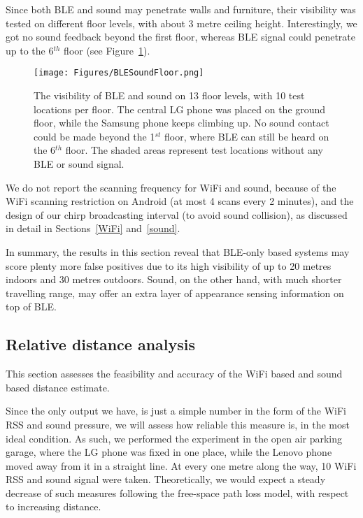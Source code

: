 \documentclass[graybox]{svmult}
\begin{document}
Since both BLE and sound may penetrate walls and furniture, their visibility was tested on different floor levels, with about 3 metre ceiling height. Interestingly, we got no sound feedback beyond the first floor, whereas BLE signal could penetrate up to the 6$^{th}$ floor (see Figure~\ref{BLESoundFloor}).
\begin{figure}[h]
    \centering
    \sidecaption
    \texttt{[image: Figures/BLESoundFloor.png]}
    \caption{The visibility of BLE and sound on 13 floor levels, with 10 test locations per floor. The central LG phone was placed on the ground floor, while the Samsung phone keeps climbing up. No sound contact could be made beyond the 1$^{st}$ floor, where BLE can still be heard on the 6$^{th}$ floor. The shaded areas represent test locations without any BLE or sound signal.}
    \label{BLESoundFloor}       
\end{figure}

We do not report the scanning frequency for WiFi and sound, because of the WiFi scanning restriction on Android (at most 4 scans every 2 minutes), and the design of our chirp broadcasting interval (to avoid sound collision), as discussed in detail in Sections~\ref{WiFi} and~\ref{sound}.

In summary, the results in this section reveal that BLE-only based systems may score plenty more false positives due to its high visibility of up to 20 metres indoors and 30 metres outdoors. Sound, on the other hand, with much shorter travelling range, may offer an extra layer of appearance sensing information on top of BLE.



\subsection{Relative distance analysis}
\label{sec:distance}
This section assesses the feasibility and accuracy of the WiFi based and sound based distance estimate.

Since the only output we have, is just a simple number in the form of the WiFi RSS and sound pressure, we will assess how reliable this measure is, in the most ideal condition. As such, we performed the experiment in the open air parking garage, where the LG phone was fixed in one place, while the Lenovo phone moved away from it in a straight line. At every one metre along the way, 10 WiFi RSS and sound signal were taken. Theoretically, we would expect a steady decrease of such measures following the free-space path loss model, with respect to increasing distance.
\end{document}
